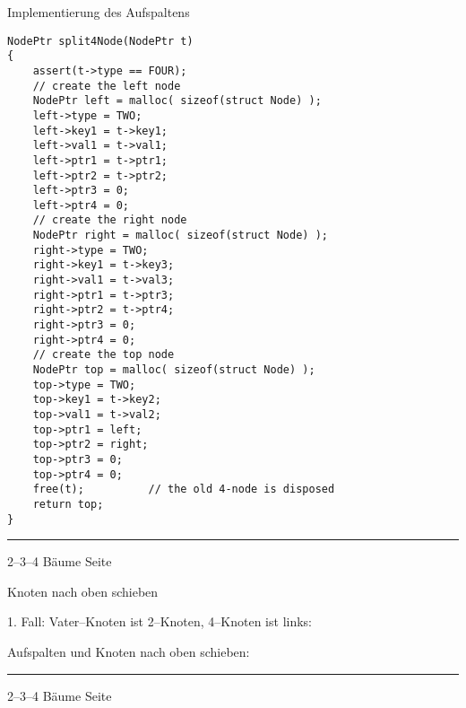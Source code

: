 \begin{slide}{}
\normalsize

\begin{center}
Implementierung des Aufspaltens
\end{center}
\vspace*{0.5cm}

\footnotesize
\begin{verbatim}
NodePtr split4Node(NodePtr t)
{
    assert(t->type == FOUR);
    // create the left node
    NodePtr left = malloc( sizeof(struct Node) );
    left->type = TWO;
    left->key1 = t->key1;
    left->val1 = t->val1;
    left->ptr1 = t->ptr1;
    left->ptr2 = t->ptr2;
    left->ptr3 = 0;
    left->ptr4 = 0;
    // create the right node
    NodePtr right = malloc( sizeof(struct Node) );
    right->type = TWO;
    right->key1 = t->key3;
    right->val1 = t->val3;
    right->ptr1 = t->ptr3;
    right->ptr2 = t->ptr4;
    right->ptr3 = 0;
    right->ptr4 = 0;
    // create the top node
    NodePtr top = malloc( sizeof(struct Node) );
    top->type = TWO;
    top->key1 = t->key2;
    top->val1 = t->val2;
    top->ptr1 = left;
    top->ptr2 = right;
    top->ptr3 = 0;
    top->ptr4 = 0;
    free(t);          // the old 4-node is disposed
    return top;
}
\end{verbatim}


\vspace*{\fill}
\tiny \addtocounter{mypage}{1}
\rule{17cm}{1mm}
2--3--4 B\"aume  \hspace*{\fill} Seite 
\end{slide}


\begin{slide}{}
\normalsize

\begin{center}
Knoten nach oben schieben 
\end{center}
\vspace*{0.5cm}

\footnotesize
1. Fall: Vater--Knoten ist 2--Knoten, 4--Knoten ist links:

\hspace*{1.3cm} 

Aufspalten und Knoten nach oben schieben:

\hspace*{1.3cm} 


\vspace*{\fill}
\tiny \addtocounter{mypage}{1}
\rule{17cm}{1mm}
2--3--4 B\"aume  \hspace*{\fill} Seite 
\end{slide}

